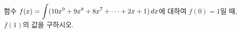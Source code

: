 함수 $f(x)=\displaystyle\int (10x^9+9x^8+8x^7+\cdots+2x+1)\mkern3mu dx$에 대하여 $f(0)=1$일 때, $f(1)$의 값을 구하시오.

